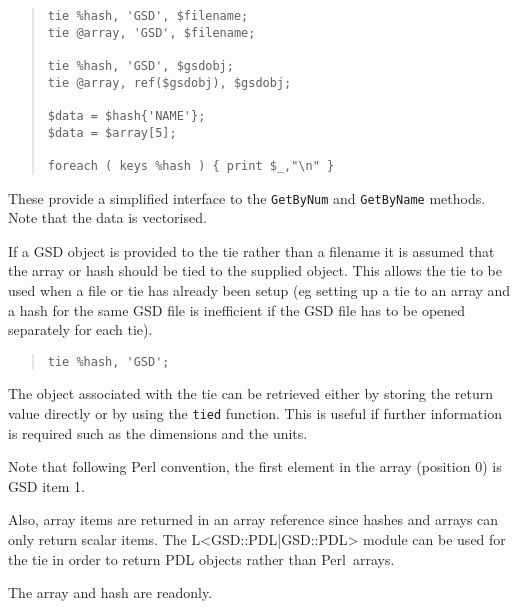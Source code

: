 \documentclass[twoside,11pt]{article}
\newenvironment{myquote}{\begin{quote}\begin{small}}{\end{small}\end{quote}}
\newcommand{\perl}{\xref{\textsf{Perl}}{sun193}{}}
\newcommand{\xref}[3]{#1}
\renewcommand{\_}{\texttt{\symbol{95}}}
\begin{document}
\begin{myquote}
\begin{verbatim}
tie %hash, 'GSD', $filename;
tie @array, 'GSD', $filename;

tie %hash, 'GSD', $gsdobj;
tie @array, ref($gsdobj), $gsdobj;

$data = $hash{'NAME'};
$data = $array[5];

foreach ( keys %hash ) { print $_,"\n" }
\end{verbatim}
\end{myquote}

These provide a simplified interface to the \texttt{GetByNum} and
\texttt{GetByName} methods. Note that the data is vectorised.



If a GSD object is provided to the tie rather than a filename it is
assumed that the array or hash should be tied to the supplied object.
This allows the tie to be used when a file or tie has already been
setup (eg setting up a tie to an array and a hash for the same GSD
file is inefficient if the GSD file has to be opened separately for
each tie).

\begin{myquote}
\begin{verbatim}
tie %hash, 'GSD';
\end{verbatim}
\end{myquote}

The object associated with the tie can be retrieved either
by storing the return value directly or by using the \texttt{tied}
function. This is useful if further information is required such
as the dimensions and the units.

Note that following Perl convention, the first element in the array
(position 0) is GSD item 1.

Also, array items are returned in an array reference since hashes
and arrays can only return scalar items.  The L<GSD::PDL|GSD::PDL>
module can be used for the tie in order to return PDL objects
rather than \perl\ arrays.


The array and hash are readonly.



\end{document}
